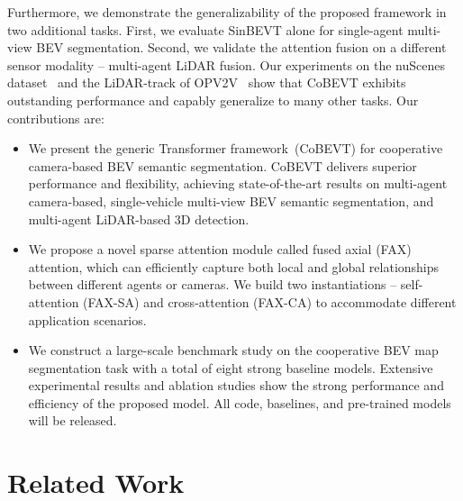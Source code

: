 \documentclass{article}
\begin{document}
Furthermore, we demonstrate the generalizability of the proposed framework in two additional tasks. First, we evaluate SinBEVT alone for single-agent multi-view BEV segmentation. Second, we validate the attention fusion on a different sensor modality -- multi-agent LiDAR fusion. Our experiments on the nuScenes dataset~\cite{caesar2020nuscenes} and the LiDAR-track of OPV2V~\cite{xu2021opv2v} show that CoBEVT exhibits outstanding performance and capably generalize to many other tasks.
%
Our contributions are:
\begin{itemize}
    
    \item We present the generic Transformer framework~(CoBEVT) for cooperative camera-based BEV semantic segmentation. CoBEVT delivers superior performance and flexibility, achieving state-of-the-art results on multi-agent camera-based, single-vehicle multi-view BEV semantic segmentation, and multi-agent LiDAR-based 3D detection.
    \vspace{-1mm}
   \item We propose a novel sparse attention module called fused axial (FAX) attention, which can efficiently capture both local and global relationships between different agents or cameras. We build two instantiations -- self-attention (FAX-SA) and cross-attention (FAX-CA) to accommodate different application scenarios.%
   \vspace{-1mm}
    \item We construct a large-scale benchmark study on the cooperative BEV map segmentation task with a total of eight strong baseline models. Extensive experimental results and ablation studies show the strong performance and efficiency of the proposed model. All code, baselines, and pre-trained models will be released.
\end{itemize}



\section{Related Work}
\label{sec:related}
\end{document}
